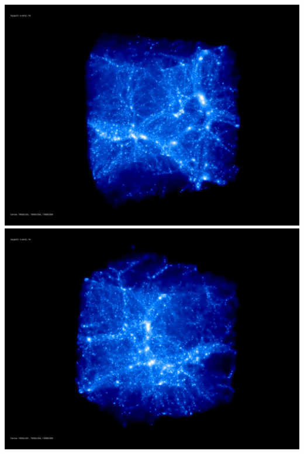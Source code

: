 \includegraphics[scale=0.1]{NGenIC_10629/rotate_00074.jpg} 
\includegraphics[scale=0.1]{NGenIC_10629/rotate_00131.jpg}

